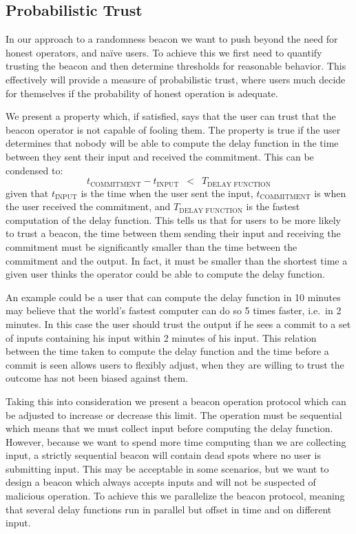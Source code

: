 \subsection{Probabilistic Trust}%
\label{sub:probabilistic_trust}
In our approach to a randomness beacon we want to push beyond the need for honest operators, and naïve users.
To achieve this we first need to quantify trusting the beacon and then determine thresholds for reasonable behavior.
This effectively will provide a measure of probabilistic trust, where users much decide for themselves if the probability of honest operation is adequate.

We present a property which, if satisfied, says that the user can trust that the beacon operator is not capable of fooling them.
The property is true if the user determines that nobody will be able to compute the delay function in the time between they sent their input and received the commitment.
This can be condensed to:
\begin{equation*}
    t_\text{COMMITMENT} - t_\text{INPUT}\enspace <\enspace T_\text{DELAY FUNCTION}
\end{equation*}
given that $t_\text{INPUT}$ is the time when the user sent the input, $t_\text{COMMITMENT}$ is when the user received the commitment, and $T_\text{DELAY FUNCTION}$ is the fastest computation of the delay function.
This tells us that for users to be more likely to trust a beacon, the time between them sending their input and receiving the commitment must be significantly smaller than the time between the commitment and the output.
In fact, it must be smaller than the shortest time a given user thinks the operator could be able to compute the delay function.

An example could be a user that can compute the delay function in 10 minutes may believe that the world's fastest computer can do so 5 times faster, i.e.\ in 2 minutes. In this case the user should trust the output if he sees a commit to a set of inputs containing his input within 2 minutes of his input.
This relation between the time taken to compute the delay function and the time before a commit is seen allows users to flexibly adjust, when they are willing to trust the outcome has not been biased against them.

Taking this into consideration we present a beacon operation protocol which can be adjusted to increase or decrease this limit.
The operation must be sequential which means that we must collect input before computing the delay function.
However, because we want to spend more time computing than we are collecting input, a strictly sequential beacon will contain dead spots where no user is submitting input.
This may be acceptable in some scenarios, but we want to design a beacon which always accepts inputs and will not be suspected of malicious operation.
To achieve this we parallelize the beacon protocol, meaning that several delay functions run in parallel but offset in time and on different input.

